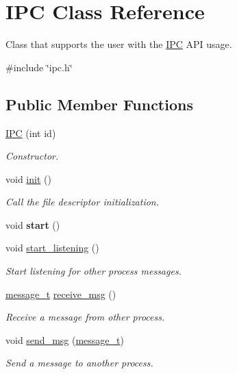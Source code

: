 \hypertarget{classdistributed__system_1_1IPC}{}\section{I\+PC Class Reference}
\label{classdistributed__system_1_1IPC}


Class that supports the user with the \hyperlink{classdistributed__system_1_1IPC}{I\+PC} A\+PI usage.  




{\ttfamily \#include \char`\"{}ipc.\+h\char`\"{}}

\subsection*{Public Member Functions}
\begin{DoxyCompactItemize}
\item 
\hyperlink{classdistributed__system_1_1IPC_a4f0157cf67601144761b69d6e4db15ef}{I\+PC} (int id)
\begin{DoxyCompactList}\small\item\em Constructor. \end{DoxyCompactList}\item 
void \hyperlink{classdistributed__system_1_1IPC_a02fd73d861ef2e4aabb38c0c9ff82947}{init} ()
\begin{DoxyCompactList}\small\item\em Call the file descriptor initialization. \end{DoxyCompactList}\item 
void {\bfseries start} ()\hypertarget{classdistributed__system_1_1IPC_a60de64d75454385b23995437f1d72669}{}\label{classdistributed__system_1_1IPC_a60de64d75454385b23995437f1d72669}

\item 
void \hyperlink{classdistributed__system_1_1IPC_a9cc1938afb0447727d7242cf37028fcb}{start\+\_\+listening} ()
\begin{DoxyCompactList}\small\item\em Start listening for other process messages. \end{DoxyCompactList}\item 
\hyperlink{structdistributed__system_1_1message__t}{message\+\_\+t} \hyperlink{classdistributed__system_1_1IPC_a16b7746dd0aedc9200f3253f4f3a9c36}{receive\+\_\+msg} ()
\begin{DoxyCompactList}\small\item\em Receive a message from other process. \end{DoxyCompactList}\item 
void \hyperlink{classdistributed__system_1_1IPC_acf64a1d5ddc831481592c0121f224b82}{send\+\_\+msg} (\hyperlink{structdistributed__system_1_1message__t}{message\+\_\+t})
\begin{DoxyCompactList}\small\item\em Send a message to another process. \end{DoxyCompactList}\end{DoxyCompactItemize}

